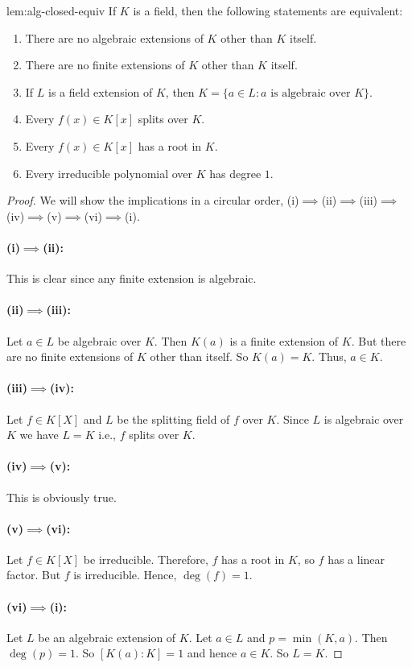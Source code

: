 \begin{lemma}{}{lem:alg-closed-equiv}
  If $K$ is a field, then the following statements are equivalent:
  \begin{enumerate}[label={(\roman*)}]
    \item There are no algebraic extensions of $K$ other than $K$ itself.
    \item There are no finite extensions of $K$ other than $K$ itself.
    \item If $L$ is a field extension of $K$, then $K=\{a\in L : a\text{ is algebraic over }K\}$.
    \item Every $f(x)\in K[x]$ splits over $K$.
    \item Every $f(x)\in K[x]$ has a root in $K$.
    \item Every irreducible polynomial over $K$ has degree $1$. 
  \end{enumerate}
\end{lemma}
\begin{proof}We will show the implications in a circular order, (i)$\implies$(ii)$\implies$(iii)$\implies$(iv)$\implies$(v)$\implies$(vi)$\implies$(i). 
  \paragraph*{(i)$\implies$(ii):} This is clear since any finite extension is algebraic.
  \paragraph*{(ii)$\implies$(iii):} Let $a\in L$ be algebraic over $K$. 
  Then $K(a)$ is a finite extension of $K$. 
  But there are no finite extensions of $K$ other than itself. 
  So $K(a)=K$. 
  Thus, $a\in K$. 
  \paragraph*{(iii)$\implies$(iv):} Let $f\in K[X]$ and $L$ be the splitting field of $f$ over $K$. Since $L$ is algebraic over $K$ we have $L=K$ i.e., $f$ splits over $K$. 
  \paragraph*{(iv)$\implies$(v):} This is obviously true. 
  \paragraph*{(v)$\implies$(vi):} Let $f\in K[X]$ be irreducible. 
  Therefore, $f$ has a root in $K$, so $f$ has a linear factor. 
  But $f$ is irreducible. 
  Hence, $\deg(f)=1$. 
  \paragraph*{(vi)$\implies$(i):} Let $L$ be an algebraic extension of $K$.
  Let $a\in L$ and $p=\min(K,a)$. 
  Then $\deg(p)=1$. 
  So $[K(a)\colon K]=1$ and hence $a\in K$. 
  So $L=K$. 
\end{proof}

